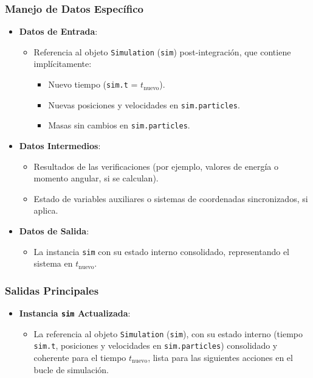 \subsubsection{Manejo de Datos Específico}
\begin{itemize}
    \item \textbf{Datos de Entrada}:
    \begin{itemize}
        \item Referencia al objeto \texttt{Simulation} (\texttt{sim}) post-integración, que contiene implícitamente:
        \begin{itemize}
            \item Nuevo tiempo (\texttt{sim.t} = $t_{\text{nuevo}}$).
            \item Nuevas posiciones y velocidades en \texttt{sim.particles}.
            \item Masas sin cambios en \texttt{sim.particles}.
        \end{itemize}
    \end{itemize}
    \item \textbf{Datos Intermedios}:
    \begin{itemize}
        \item Resultados de las verificaciones (por ejemplo, valores de energía o momento angular, si se calculan).
        \item Estado de variables auxiliares o sistemas de coordenadas sincronizados, si aplica.
    \end{itemize}
    \item \textbf{Datos de Salida}:
    \begin{itemize}
        \item La instancia \texttt{sim} con su estado interno consolidado, representando el sistema en $t_{\text{nuevo}}$.
    \end{itemize}
\end{itemize}

\subsubsection{Salidas Principales}
\begin{itemize}
    \item \textbf{Instancia \texttt{sim} Actualizada}:
    \begin{itemize}
        \item La referencia al objeto \texttt{Simulation} (\texttt{sim}), con su estado interno (tiempo \texttt{sim.t}, posiciones y velocidades en \texttt{sim.particles}) consolidado y coherente para el tiempo $t_{\text{nuevo}}$, lista para las siguientes acciones en el bucle de simulación.
    \end{itemize}
\end{itemize}

